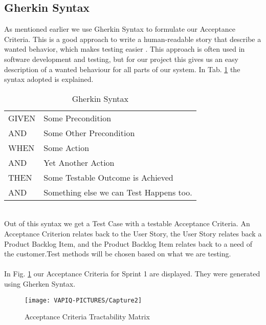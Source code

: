 \subsection{Gherkin Syntax}
As mentioned earlier we use Gherkin Syntax to formulate our Acceptance Criteria. This is a good approach to write a human-readable story that describe a wanted behavior, which makes testing easier \cite{ref7}. This approach is often used in software development and testing, but for our project this gives us an easy description of a wanted behaviour for all parts of our system. In Tab. \ref{tab:gherkin} the syntax adopted is explained. 
\begin {table}[h]
    \begin{center}
    \caption {Gherkin Syntax} 
    \label{tab:gherkin} 
    \begin{tabular}{|l|l|}\hline 
    GIVEN   &   Some Precondition \\ \rowcolor{gainsboro}
    AND    &   Some Other Precondition        \\
    WHEN    &   Some Action        \\ \rowcolor{gainsboro}
    AND    &   Yet Another Action        \\
    THEN    &   Some Testable Outcome is Achieved       \\ \rowcolor{gainsboro}
    AND    &   Something else we can Test Happens too.   \\
    \hline
    \end{tabular}
    \end{center}
\end{table}
\\
Out of this syntax we get a Test Case with a testable Acceptance Criteria. An Acceptance Criterion relates back to the User Story, the User Story relates back a Product Backlog Item, and the Product Backlog Item relates back to a need of the customer.Test methods will be chosen based on what we are testing.\\
\\
In Fig. \ref{fig:ACmatrix} our Acceptance Criteria for Sprint 1 are displayed. They were generated using Gherken Syntax.

\begin{figure}[h]
    \centering
        \texttt{[image: VAPIQ-PICTURES/Capture2]}
        \caption{Acceptance Criteria Tractability Matrix}
        \label{fig:ACmatrix}
\end{figure}


\newpage

